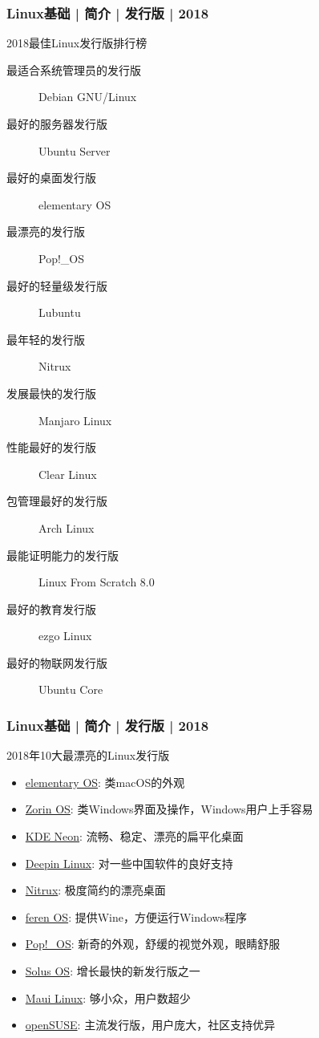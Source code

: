 \begin{frame}
  \frametitle{Linux基础 | 简介 | 发行版 | 2018}
  \begin{block}{2018最佳Linux发行版排行榜}
    \begin{description}
      \item[最适合系统管理员的发行版] Debian GNU/Linux
      \item[最好的服务器发行版] Ubuntu Server
      \item[最好的桌面发行版] elementary OS
      \item[最漂亮的发行版] Pop!\_OS
      \item[最好的轻量级发行版] Lubuntu
      \item[最年轻的发行版] Nitrux
      \item[发展最快的发行版] Manjaro Linux
      \item[性能最好的发行版] Clear Linux
      \item[包管理最好的发行版] Arch Linux
      \item[最能证明能力的发行版] Linux From Scratch 8.0
      \item[最好的教育发行版] ezgo Linux
      \item[最好的物联网发行版] Ubuntu Core
    \end{description}
  \end{block}
\end{frame}

\begin{frame}
  \frametitle{Linux基础 | 简介 | 发行版 | 2018}
  \begin{block}{2018年10大最漂亮的Linux发行版}
    \begin{itemize}
      \item \href{https://elementary.io/}{elementary OS}: 类macOS的外观
      \item \href{https://zorinos.com/}{Zorin OS}: 类Windows界面及操作，Windows用户上手容易
      \item \href{https://neon.kde.org/}{KDE Neon}: 流畅、稳定、漂亮的扁平化桌面
      \item \href{http://www.deepin.com}{Deepin Linux}: 对一些中国软件的良好支持
      \item \href{https://nxos.org/}{Nitrux}: 极度简约的漂亮桌面
      \item \href{http://ferenos.weebly.com/}{feren OS}: 提供Wine，方便运行Windows程序
      \item \href{https://system76.com/pop}{Pop!\_OS}: 新奇的外观，舒缓的视觉外观，眼睛舒服
      \item \href{https://solus-project.com/}{Solus OS}: 增长最快的新发行版之一
      \item \href{https://mauilinux.org/}{Maui Linux}: 够小众，用户数超少
      \item \href{https://www.opensuse.org}{openSUSE}: 主流发行版，用户庞大，社区支持优异
    \end{itemize}
  \end{block}
\end{frame}

